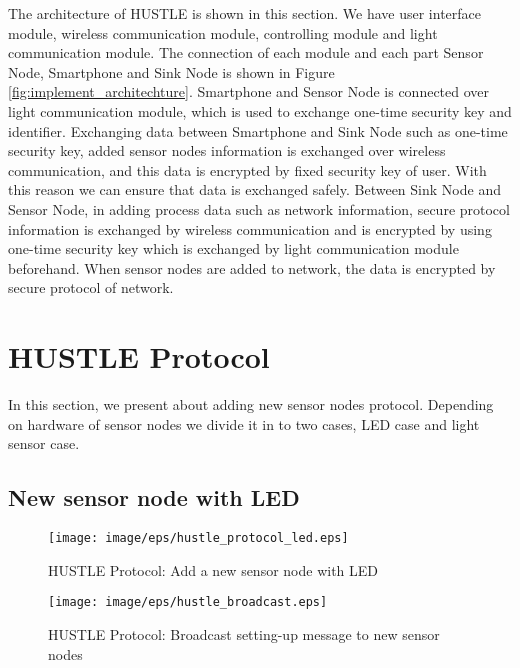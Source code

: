 The architecture of HUSTLE is shown in this section. We have user interface module, wireless communication module, controlling module and light communication module. The connection of each module and each part Sensor Node, Smartphone and Sink Node is shown in Figure \ref{fig:implement_architechture}. Smartphone and Sensor Node is connected over light communication module, which is used to exchange one-time security key and identifier. Exchanging data between Smartphone and Sink Node such as one-time security key, added sensor nodes information is exchanged over wireless communication, and this data is encrypted by fixed security key of user. With this reason we can ensure that data is exchanged safely. Between Sink Node and Sensor Node, in adding process data such as network information, secure protocol information is exchanged by wireless communication and is encrypted by using one-time security key which is exchanged by light communication module beforehand. When sensor nodes are added to network, the data is encrypted by secure protocol of network.

\section{HUSTLE Protocol}\label{sec:hustle_protocol}

In this section, we present about adding new sensor nodes protocol. Depending on hardware of sensor nodes we divide it in to two cases, LED case and light sensor case.

\subsection{New sensor node with LED}
\begin{figure}[tb]
\begin{center}
\texttt{[image: image/eps/hustle\_protocol\_led.eps]}
\caption{HUSTLE Protocol: Add a new sensor node with LED}
\label{fig:hustle_protocol_led}
\end{center}
\end{figure}

\begin{figure}[tb]
\begin{center}
\texttt{[image: image/eps/hustle\_broadcast.eps]}
\caption{HUSTLE Protocol: Broadcast setting-up message to new sensor nodes}
\label{fig:hustle_broadcast}
\end{center}
\end{figure}

